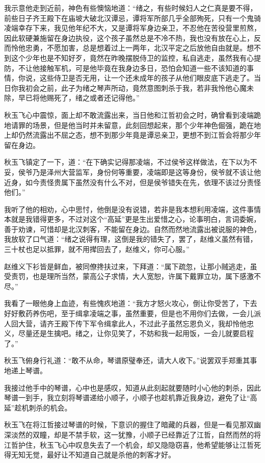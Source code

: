 我示意他走到近前，神色有些懊恼地道：“绪之，有些时候妇人之仁真是要不得，前些日子齐王殿下在庙坡大破北汉谭忌，谭将军所部几乎全部殉死，只有一个鬼骑凌端幸存下来，我见他年纪不大，又是谭将军身边亲卫，不忍他在苦役营里煎熬，因此软硬兼施留在身边执役，这个孩子虽然总是不冷不热，我也没有放在心上，反而怜他忠勇，不愿加害，总是想着过上一两年，北汉平定之后放他自由就是。想不到这个少年也是不知好歹，竟然在昨晚摆脱侍卫的监控，私自逃走，虽然我有心提防，不让他接触军机，可是他毕竟在我身边多日，恐怕会知道一些不该知道的事情，你说，这些侍卫是否无用，让一个还未成年的孩子从他们眼皮底下逃走了。当日你我初会之前，此子为绪之琴声所动，竟然意图刺杀于我，若非我怜他心魔未除，早已将他赐死了，绪之或者还记得他。”

秋玉飞心中震惊，面上却不敢流露出来，当日他和江哲初会之时，确曾看到凌端跪地请罪的场景，但是他当时并未留意，此刻回想起来，那个少年神色倔强，跪在地上却仍然流露出不屈之态，想不到那少年竟是谭忌亲卫，更想不到江哲会将那少年留在身边。

秋玉飞镇定了一下，道：“在下确实记得那凌端，不过侯爷这样做法，在下以为不妥，侯爷乃是泽州大营监军，身份何等重要，凌端即是这等身份，侯爷就不该让他近身，如今责怪贵属下虽然没有什么不对，但是侯爷错失在先，依理不该过分责怪他们。”

我听了他的相劝，心中思忖，他倒是没有说错，若非是我本想利用凌端，这件事情本就是我错得更多，不过对这个“高延”更是生出爱惜之心，论事明白，言词委婉，善于劝谏，可惜却是北汉刺客，不能留在身边。自然而然地流露出被说服的神色，我放软了口气道：“绪之说得有理，这倒是我的错失了，罢了，赵维义虽然有错，三十杖也足以抵罪，就不用撵回去了，赵维义，你可心服。”

赵维义下衫皆是鲜血，被同僚搀扶过来，下拜道：“属下疏忽，让那小贼逃走，虽受责罚，也是理所当然，蒙高公子求情，大人宽恕，许属下戴罪立功，属下感激不尽。”

我看了一眼他身上血迹，有些愧疚地道：“我方才怒火攻心，倒让你受苦了，下去好好敷药养伤吧，至于缉拿凌端之事，虽然重要，但是也不用你们去做，一会儿派人回大营，请齐王殿下传下军令缉拿此人，不过此子虽然忘恩负义，我却怜他忠义，尽量还是生擒吧。绪之，让你见笑了，不妨和我一起用饭，一会儿就要启程了。”

秋玉飞俯身行礼道：“敢不从命，琴谱原璧奉还，请大人收下。”说罢双手郑重其事地递上琴谱。

我接过他手中的琴谱，心中也是感叹，知道从此刻起就要随时小心他的刺杀，因此琴谱一到手，我立刻将琴谱递给小顺子，小顺子也趁机靠近我身边，避免了让“高延”趁机刺杀的机会。

秋玉飞在将江哲接过琴谱的时候，下意识的握住了暗藏的兵器，但是一看见那双幽深淡然的双瞳，却是不禁手软，这一犹豫，小顺子已经靠近了江哲，自然而然的将江哲护住，秋玉飞心中叹息失去了一个机会，却又隐隐窃喜，他希望能够让江哲死得无知无觉，最好让不知道自己就是杀他的刺客才好。

